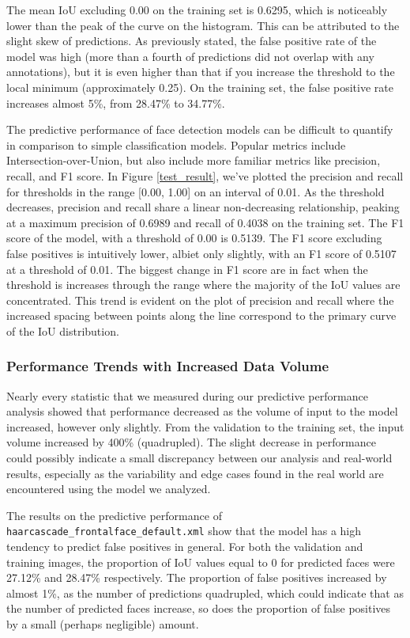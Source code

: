 \documentclass[conference]{IEEEtran}
\begin{document}
The mean IoU excluding 0.00 on the training set is 0.6295, which is noticeably lower than the peak of the curve on the histogram. This can be attributed to the slight skew of predictions. As previously stated, the false positive rate of the model was high (more than a fourth of predictions did not overlap with any annotations), but it is even higher than that if you increase the threshold to the local minimum (approximately 0.25). On the training set, the false positive rate increases almost 5\%, from 28.47\% to 34.77\%.

The predictive performance of face detection models can be difficult to quantify in comparison to simple classification models. Popular metrics include Intersection-over-Union, but also include more familiar metrics like precision, recall, and F1 score. In Figure \ref{test_result}, we've plotted the precision and recall for thresholds in the range [0.00, 1.00] on an interval of 0.01. As the threshold decreases, precision and recall share a linear non-decreasing relationship, peaking at a maximum precision of 0.6989 and recall of 0.4038 on the training set. The F1 score of the model, with a threshold of 0.00 is 0.5139. The F1 score excluding false positives is intuitively lower, albiet only slightly, with an F1 score of 0.5107 at a threshold of 0.01. The biggest change in F1 score are in fact when the threshold is increases through the range where the majority of the IoU values are concentrated. This trend is evident on the plot of precision and recall where the increased spacing between points along the line correspond to the primary curve of the IoU distribution.

\subsubsection{Performance Trends with Increased Data Volume}
Nearly every statistic that we measured during our predictive performance analysis showed that performance decreased as the volume of input to the model increased, however only slightly. From the validation to the training set, the input volume increased by 400\% (quadrupled). The slight decrease in performance could possibly indicate a small discrepancy between our analysis and real-world results, especially as the variability and edge cases found in the real world are encountered using the model we analyzed. 

The results on the predictive performance of \texttt{haarcascade\_frontalface\_default.xml} show that the model has a high tendency to predict false positives in general. For both the validation and training images, the proportion of IoU values equal to 0 for predicted faces were 27.12\% and 28.47\% respectively. The proportion of false positives increased by almost 1\%, as the number of predictions quadrupled, which could indicate that as the number of predicted faces increase, so does the proportion of false positives by a small (perhaps negligible) amount.
\end{document}
